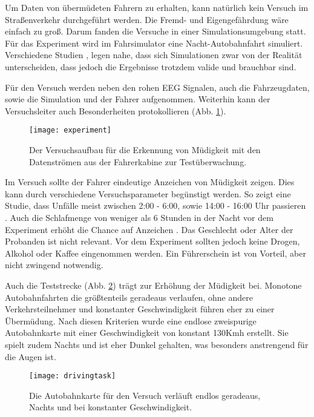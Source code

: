 \label{chap:data}
Um Daten von übermüdeten Fahrern zu erhalten, kann natürlich kein Versuch im Straßenverkehr durchgeführt werden. Die Fremd- und Eigengefährdung wäre einfach zu groß. Darum fanden die Versuche in einer Simulationsumgebung statt. Für das Experiment wird im Fahrsimulator eine Nacht-Autobahnfahrt simuliert. Verschiedene Studien \cite{Engstrom_2322937}, \cite{Horne_1757738} legen nahe, dass sich  Simulationen zwar von der Realität unterscheiden, dass jedoch die Ergebnisse trotzdem valide und brauchbar sind.

Für den Versuch werden neben den rohen EEG Signalen, auch die Fahrzeugdaten, sowie die Simulation und der Fahrer aufgenommen. Weiterhin kann der Versuchsleiter auch Besonderheiten protokollieren (Abb. \ref{fig:experiment}).

\begin{figure}[h] 
  \begin{center}
    \texttt{[image: experiment]}
    \caption[Experiment]{Der Versuchsaufbau für die Erkennung von Müdigkeit mit den Datenströmen aus der Fahrerkabine zur Testüberwachung. \label{fig:experiment}}
  \end{center}
\end{figure}

Im Versuch sollte der Fahrer eindeutige Anzeichen von Müdigkeit zeigen. Dies kann durch verschiedene Versuchsparameter begünstigt werden. So zeigt eine Studie, dass Unfälle meist zwischen 2:00 - 6:00, sowie 14:00 - 16:00 Uhr passieren \cite{Horne_1757738}. Auch die Schlafmenge von weniger als 6 Stunden in der Nacht vor dem Experiment erhöht die Chance auf Anzeichen \cite{Engstrom_2322937}. Das Geschlecht oder Alter der Probanden ist nicht relevant. Vor dem Experiment sollten jedoch keine Drogen, Alkohol oder Kaffee eingenommen werden. Ein Führerschein ist von Vorteil, aber nicht zwingend notwendig.

Auch die Teststrecke (Abb. \ref{fig:drivingtask}) trägt zur Erhöhung der Müdigkeit bei. Monotone Autobahnfahrten die größtenteils geradeaus verlaufen, ohne andere Verkehrsteilnehmer und konstanter Geschwindigkeit führen eher zu einer Übermüdung. Nach diesen Kriterien wurde eine endlose zweispurige Autobahnkarte mit einer Geschwindigkeit von konstant 130Kmh erstellt. Sie spielt zudem Nachts und ist eher Dunkel gehalten, was besonders anstrengend für die Augen ist.

\begin{figure}[h] 
  \begin{center}
    \texttt{[image: drivingtask]}
    \caption[Driving Task]{Die Autobahnkarte für den Versuch verläuft endlos geradeaus, Nachts und bei konstanter Geschwindigkeit. \label{fig:drivingtask}}
  \end{center}
\end{figure}


